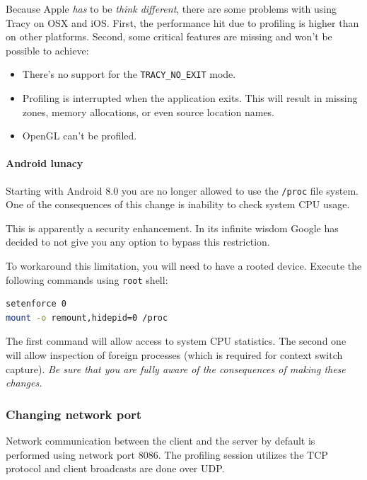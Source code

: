\documentclass[hidelinks,titlepage,a4paper]{article}
\begin{document}
Because Apple \emph{has} to be \emph{think different}, there are some problems with using Tracy on OSX and iOS. First, the performance hit due to profiling is higher than on other platforms. Second, some critical features are missing and won't be possible to achieve:

\begin{itemize}
\item There's no support for the \texttt{TRACY\_NO\_EXIT} mode.
\item Profiling is interrupted when the application exits. This will result in missing zones, memory allocations, or even source location names.
\item OpenGL can't be profiled.
\end{itemize}

\paragraph{Android lunacy}
\label{androidlunacy}

Starting with Android 8.0 you are no longer allowed to use the \texttt{/proc} file system. One of the consequences of this change is inability to check system CPU usage.

This is apparently a security enhancement. In its infinite wisdom Google has decided to not give you any option to bypass this restriction.

To workaround this limitation, you will need to have a rooted device. Execute the following commands using \texttt{root} shell:

\begin{lstlisting}[language=sh]
setenforce 0
mount -o remount,hidepid=0 /proc
\end{lstlisting}

The first command will allow access to system CPU statistics. The second one will allow inspection of foreign processes (which is required for context switch capture). \emph{Be sure that you are fully aware of the consequences of making these changes.}

\subsubsection{Changing network port}

Network communication between the client and the server by default is performed using network port 8086. The profiling session utilizes the TCP protocol and client broadcasts are done over UDP.
\end{document}
